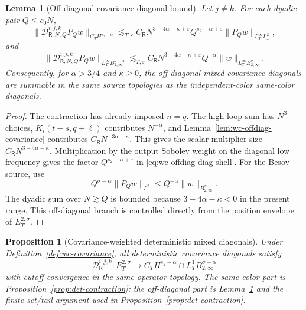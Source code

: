 \documentclass[10pt]{amsart}
\numberwithin{equation}{section}
\theoremstyle{plain}
\newtheorem{proposition}[theorem]{Proposition}
\newtheorem{lemma}[theorem]{Lemma}
\theoremstyle{definition}
\theoremstyle{remark}
\newcommand{\eps}{\varepsilon}
\begin{document}
\begin{lemma}[Off-diagonal covariance diagonal bound]\label{lem:wc-offdiag-diagonal-bound}
Let \(j\ne k\).  For each dyadic pair \(Q\le c_0N\),
\begin{equation}\label{eq:wc-offdiag-diag-shell}
        \|\mathcal D_{\mathsf R,N,Q}^{i;j,k}P_Qw\|_{C_TH^{s_2-\alpha}}
        \lesssim_{T,\eps} C_{\mathsf R}
        N^{3-4\alpha-\kappa+\eps}Q^{s_2-\alpha+\eps}
        \|P_Qw\|_{L_T^\infty L_x^2},
\end{equation}
and
\begin{equation}\label{eq:wc-offdiag-diag-besov-shell}
        \|\mathcal D_{\mathsf R,N,Q}^{i;j,k}P_Qw\|_{L_T^\infty B_{2,\infty}^{\sigma-\alpha}}
        \lesssim_{T,\eps} C_{\mathsf R}
        N^{3-4\alpha-\kappa+\eps}Q^{-\alpha}
        \|w\|_{L_T^\infty B_{2,\infty}^{\sigma}}.
\end{equation}
Consequently, for \(\alpha>3/4\) and \(\kappa\ge0\), the off-diagonal mixed covariance diagonals are summable in the same source topologies as the independent-color same-color diagonals.
\end{lemma}

\begin{proof}
The contraction has already imposed \(n=q\).  The high-loop sum has \(N^3\) choices, \(K_i(t-s,q+\ell)\) contributes \(N^{-\alpha}\), and Lemma~\ref{lem:wc-offdiag-covariance} contributes \(C_{\mathsf R}N^{-3\alpha-\kappa}\).  This gives the scalar multiplier size \(C_{\mathsf R}N^{3-4\alpha-\kappa}\).  Multiplication by the output Sobolev weight on the diagonal low frequency gives the factor \(Q^{s_2-\alpha+\eps}\) in \eqref{eq:wc-offdiag-diag-shell}.  For the Besov source, use
\[
        Q^{\sigma-\alpha}\|P_Qw\|_{L^2}
        \le Q^{-\alpha}\|w\|_{B_{2,\infty}^{\sigma}}.
\]
The dyadic sum over \(N\gtrsim Q\) is bounded because \(3-4\alpha-\kappa<0\) in the present range.  This off-diagonal branch is controlled directly from the position envelope of \(E_T^{2,\sigma}\).
\end{proof}

\begin{proposition}[Covariance-weighted deterministic mixed diagonals]\label{prop:wc-deterministic-diagonals}
Under Definition~\ref{def:wc-covariance}, all deterministic covariance diagonals satisfy
\begin{equation}\label{eq:wc-diag-global-bound}
        \mathcal D_{\mathsf R}^{i;j,k}:
        E_T^{2,\sigma}\longrightarrow C_TH^{s_2-\alpha}\cap L_T^1B_{2,\infty}^{\sigma-\alpha}
\end{equation}
with cutoff convergence in the same operator topology.  The same-color part is Proposition~\ref{prop:det-contraction}; the off-diagonal part is Lemma~\ref{lem:wc-offdiag-diagonal-bound} and the finite-set/tail argument used in Proposition~\ref{prop:det-contraction}.
\end{proposition}
\end{document}

